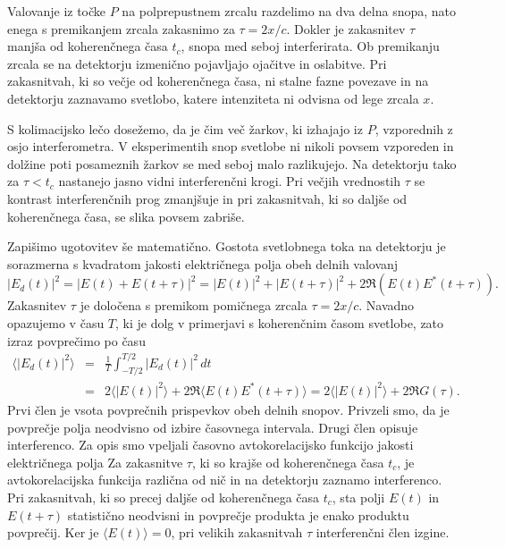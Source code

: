 Valovanje iz točke $P$ na polprepustnem zrcalu razdelimo na dva delna snopa, 
nato enega s premikanjem zrcala zakasnimo za $\tau=2x/c$. Dokler je zakasnitev
$\tau$ manjša od koherenčnega časa $t_{c}$, snopa med seboj interferirata.
Ob premikanju zrcala se na detektorju izmenično pojavljajo ojačitve in 
oslabitve. Pri zakasnitvah, ki so večje od koherenčnega časa, ni stalne fazne 
povezave in na detektorju zaznavamo svetlobo, katere intenziteta ni odvisna od lege
zrcala $x$.

\begin{remark}
S kolimacijsko lečo dosežemo, da je čim več žarkov, ki izhajajo iz
$P$, vzporednih z osjo interferometra. V eksperimentih snop svetlobe 
ni nikoli povsem vzporeden in dolžine poti posameznih žarkov se med
seboj malo razlikujejo. Na detektorju tako za $\tau < t_c$ nastanejo jasno 
vidni interferenčni krogi. Pri večjih vrednostih $\tau$  se kontrast interferenčnih
prog zmanjšuje in pri zakasnitvah, ki so daljše od koherenčnega časa, se 
slika povsem zabriše. 
\end{remark}

Zapišimo ugotovitev še matematično.
Gostota svetlobnega toka na detektorju je sorazmerna s kvadratom jakosti električnega
polja obeh delnih valovanj
\begin{equation}
|E_{d}(t)|^{2}=|E(t)+E(t+\tau)|^{2}=|E(t)|^{2}+|E(t+\tau)|^{2}+2\Re \left(E(t)E^{*}(t+\tau)\right).
\label{eq:Michelson-intenziteta}
\end{equation}
Zakasnitev $\tau$ je določena s premikom pomičnega zrcala $\tau=2x/c$.
Navadno opazujemo v času $T$, ki je dolg v primerjavi s koherenčnim
časom svetlobe, zato izraz povprečimo po času
\begin{eqnarray}
\langle|E_{d}(t)|^{2}\rangle & = & \frac{1}{T}\int_{-T/2}^{T/2}|E{}_{d}(t)|^{2}\, dt\nonumber \\
 & = & 2\langle|E(t)|^{2}\rangle+2\Re\langle E(t)E^{*}(t+\tau)\rangle = 2\langle|E(t)|^{2}\rangle+2\Re G(\tau).
 \label{eq:caskohav}
\end{eqnarray}
Prvi člen je vsota povprečnih prispevkov obeh delnih snopov. Privzeli smo, 
da je povprečje polja neodvisno od izbire časovnega intervala.
Drugi člen opisuje interferenco. 
Za opis smo vpeljali
časovno avtokorelacijsko funkcijo
jakosti električnega polja 
Za zakasnitve $\tau$, ki so krajše od koherenčnega časa $t_c$, je avtokorelacijska
funkcija različna od nič in na
detektorju zaznamo interferenco. Pri zakasnitvah, ki so precej
daljše od koherenčnega časa $t_{c}$, sta polji $E(t)$ in $E(t+\tau)$
statistično neodvisni in povprečje produkta je enako produktu povprečij.
Ker je $\langle E(t)\rangle=0$, pri velikih zakasnitvah $\tau$ interferenčni
člen izgine.

